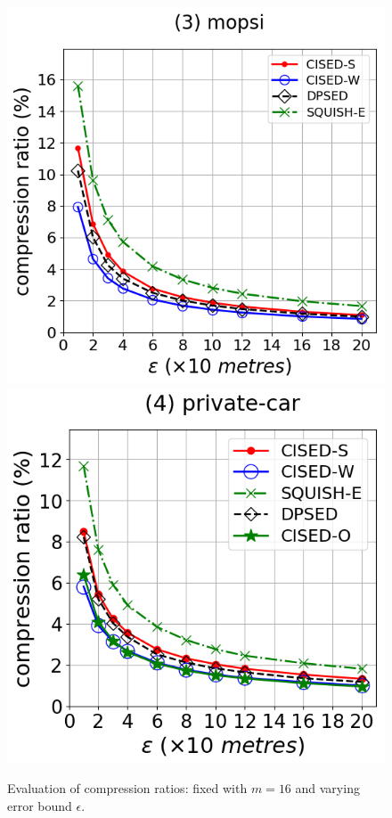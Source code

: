 \begin{figure}[tb!]
\includegraphics[scale = 0.3]{Figures/Exp-CR-epsilon-mopsi.png}
\includegraphics[scale = 0.3]{Figures/Exp-CR-epsilon-private.png}
\vspace{-1ex}
\caption{\small Evaluation of compression ratios: fixed with $m=16$ and varying error bound $\epsilon$.}
\label{fig:cr-m16}
\vspace{-1.0ex}
\end{figure}


